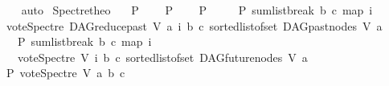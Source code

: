 \begin{isabellebody}
%
\isadelimproof
\ \ %
\endisadelimproof
%
\isatagproof
{}\isamarkupfalse%
\ auto%
\endisatagproof
{\isafoldproof}%
%
\isadelimproof
\isanewline
%
\endisadelimproof
\isanewline
{}\isamarkupfalse%
\ Spectre{\isacharunderscore}{\kern0pt}theo{\isacharcolon}{\kern0pt}\isanewline
\ \ \ {\isachardoublequoteopen}P\ {}{\isachardoublequoteclose}\isanewline
\ \ \ {\isachardoublequoteopen}P\ {}{\isachardoublequoteclose}\isanewline
\ \ \ {\isachardoublequoteopen}P\ {\isacharparenleft}{\kern0pt}{\isacharminus}{\kern0pt}{}{\isacharparenright}{\kern0pt}{\isachardoublequoteclose}\ \isanewline
\ \ \ {\isachardoublequoteopen}P\ {\isacharparenleft}{\kern0pt}sumlist{\isacharunderscore}{\kern0pt}break\ b\ c\ {\isacharparenleft}{\kern0pt}map\ {\isacharparenleft}{\kern0pt}{\isasymlambda}i{\isachardot}{\kern0pt}\isanewline
\ {\isacharparenleft}{\kern0pt}vote{\isacharunderscore}{\kern0pt}Spectre\ {\isacharparenleft}{\kern0pt}DAG{\isachardot}{\kern0pt}reduce{\isacharunderscore}{\kern0pt}past\ V\ a{\isacharparenright}{\kern0pt}\ i\ b\ c{\isacharparenright}{\kern0pt}{\isacharparenright}{\kern0pt}\ {\isacharparenleft}{\kern0pt}sorted{\isacharunderscore}{\kern0pt}list{\isacharunderscore}{\kern0pt}of{\isacharunderscore}{\kern0pt}set\ {\isacharparenleft}{\kern0pt}{\isacharparenleft}{\kern0pt}DAG{\isachardot}{\kern0pt}past{\isacharunderscore}{\kern0pt}nodes\ V\ a{\isacharparenright}{\kern0pt}{\isacharparenright}{\kern0pt}{\isacharparenright}{\kern0pt}{\isacharparenright}{\kern0pt}{\isacharparenright}{\kern0pt}{\isachardoublequoteclose}\isanewline
\ \ \ {\isachardoublequoteopen}P\ {\isacharparenleft}{\kern0pt}sumlist{\isacharunderscore}{\kern0pt}break\ b\ c\ {\isacharparenleft}{\kern0pt}map\ {\isacharparenleft}{\kern0pt}{\isasymlambda}i{\isachardot}{\kern0pt}\isanewline
\ \ \ {\isacharparenleft}{\kern0pt}vote{\isacharunderscore}{\kern0pt}Spectre\ V\ i\ b\ c{\isacharparenright}{\kern0pt}{\isacharparenright}{\kern0pt}\ {\isacharparenleft}{\kern0pt}sorted{\isacharunderscore}{\kern0pt}list{\isacharunderscore}{\kern0pt}of{\isacharunderscore}{\kern0pt}set\ {\isacharparenleft}{\kern0pt}DAG{\isachardot}{\kern0pt}future{\isacharunderscore}{\kern0pt}nodes\ V\ a{\isacharparenright}{\kern0pt}{\isacharparenright}{\kern0pt}{\isacharparenright}{\kern0pt}{\isacharparenright}{\kern0pt}{\isachardoublequoteclose}\isanewline
{}\ {\isachardoublequoteopen}P\ {\isacharparenleft}{\kern0pt}vote{\isacharunderscore}{\kern0pt}Spectre\ V\ a\ b\ c{\isacharparenright}{\kern0pt}{\isachardoublequoteclose}\isanewline

\end{isabellebody}
